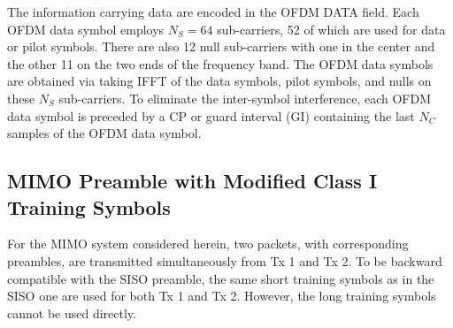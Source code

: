 \documentclass[11pt,draftnofoot,onecolumn]{IEEEtran}
\begin{document}
The information carrying data are encoded in the OFDM DATA field.
Each OFDM data symbol employs $N_S = 64$ sub-carriers,
52 of which are used for data or
pilot symbols. There are also 12 null sub-carriers
with one in the center and the other 11 on the two
ends of the frequency band.
The OFDM data symbols
are obtained via taking IFFT
of the data symbols, pilot symbols, and nulls on these $N_S$ sub-carriers.
To eliminate the
inter-symbol interference, each OFDM data symbol is
preceded by a CP or guard interval (GI) containing the
last $N_C$ samples of the OFDM data symbol.

\subsection{MIMO Preamble with Modified Class I Training Symbols}

For the MIMO system considered herein,
two packets, with corresponding preambles,
are transmitted simultaneously from Tx 1 and Tx 2.
To be backward compatible with the SISO preamble,
the same short training symbols as in the
SISO one are used for both Tx 1 and Tx 2. However, the
long training symbols cannot be used directly.
\end{document}

